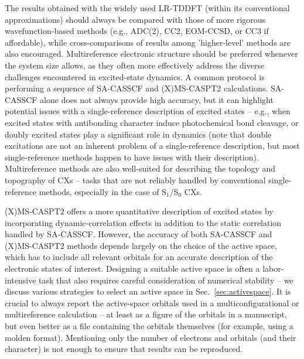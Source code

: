 \documentclass[9pt,bestpractices]{livecoms}
\begin{document}
The results obtained with the widely used LR-TDDFT (within its conventional approximations) should always be compared with those of more rigorous wavefunction-based methods (e.g., ADC(2), CC2, EOM-CCSD, or CC3 if affordable), while cross-comparisons of results among 'higher-level' methods are also encouraged. Multireference electronic structure should be preferred whenever the system size allows, as they often more effectively address the diverse challenges encountered in excited-state dynamics. A common protocol is performing a sequence of SA-CASSCF and (X)MS-CASPT2 calculations. SA-CASSCF alone does not always provide high accuracy, but it can highlight potential issues with a single-reference description of excited states -- e.g., when excited states with antibonding character induce photochemical bond cleavage, or doubly excited states play a significant role in dynamics (note that double excitations are not an inherent problem of a single-reference description, but most single-reference methods happen to have issues with their description). Multireference methods are also well-suited for describing the topology and topography of CXs -- tasks that are not reliably handled by conventional single-reference methods, especially in the case of S$_{1}$/S$_{0}$ CXs.\cite{tuna2015assessment,taylor2023description}

(X)MS-CASPT2 offers a more quantitative description of excited states by incorporating dynamic-correlation effects in addition to the static correlation handled by SA-CASSCF. However, the accuracy of both SA-CASSCF and (X)MS-CASPT2 methods depends largely on the choice of the active space, which has to include all relevant orbitals for an accurate description of the electronic states of interest. Designing a suitable active space is often a labor-intensive task that also requires careful consideration of numerical stability -- we discuss various strategies to select an active space in Sec.~\ref{sec:activespace}. It is crucial to always report the active-space orbitals used in a multiconfigurational or multireference calculation -- at least as a figure of the orbitals in a manuscript, but even better as a file containing the orbitals themselves (for example, using a molden format). Mentioning only the number of electrons and orbitals (and their character) is not enough to ensure that results can be reproduced. 
\end{document}
